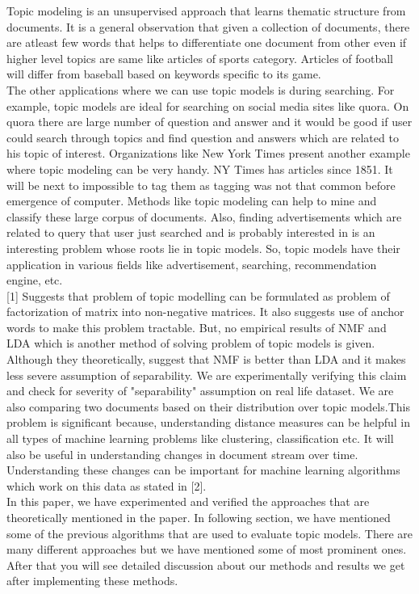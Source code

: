\documentclass[a4paper,11pt]{article}
\begin{document}
Topic modeling is an unsupervised approach that learns thematic structure from documents. It is a general observation that given a collection of documents, there are atleast few words that helps to differentiate one document from other even if higher level topics are same like articles of sports category. Articles of football will differ from baseball based on keywords specific to its game. \\

The other applications where we can use topic models is during searching. For example, topic models are ideal for searching on social media sites like quora. On quora there are large number of question and answer and it would be good if user could search through topics and find question and answers which are related to his topic of interest. Organizations like New York Times present another example where topic modeling can be very handy. NY Times has articles since 1851. It will be next to impossible to tag them as tagging was not that common before emergence of computer. Methods like topic modeling can help to mine and classify these large corpus of documents. Also, finding advertisements which are related to query that user just searched and is probably interested in is an interesting problem whose roots lie in topic models. So, topic models have their application in various fields like advertisement, searching, recommendation engine, etc. \\

[1] Suggests that problem of topic modelling can be formulated as problem of factorization of matrix into non-negative matrices. It also suggests use of anchor words to make this problem tractable. But, no empirical results of NMF and LDA which is another method of solving problem of topic models is given. Although they theoretically, suggest that NMF is better than LDA and it makes less severe assumption of separability. We are experimentally verifying this claim and check for severity of "separability" assumption on real life dataset. We are also comparing two documents based on their distribution over topic models.This problem is significant because, understanding distance measures can be helpful in all types of machine learning problems like clustering, classification etc. It will also be useful in understanding changes in document stream over time. Understanding these changes can be important for machine learning algorithms which work on this data as stated in [2]. \\

In this paper, we have experimented and verified the approaches that are theoretically mentioned in the paper. In following section, we have mentioned some of the previous algorithms that are used to evaluate topic models. There are many different approaches but we have mentioned some of most prominent ones. After that you will see detailed discussion about our methods and results we get after implementing these methods. \\
\end{document}
